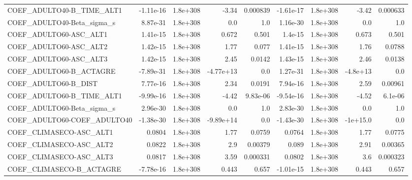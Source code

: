 \begin{tabular}{lrrrrrrrr}
COEF\_ADULTO40-B\_TIME\_ALT1         &   -1.11e-16 &     1.8e+308 &     -3.34 & 0.000839 &  -1.61e-17 &    1.8e+308 &        -3.42 &      0.000633 \\
COEF\_ADULTO40-Beta\_sigma\_s        &    8.87e-31 &     1.8e+308 &       0.0 &      1.0 &   1.16e-30 &    1.8e+308 &          0.0 &           1.0 \\
COEF\_ADULTO60-ASC\_ALT1            &    1.41e-15 &     1.8e+308 &     0.672 &    0.501 &    1.4e-15 &    1.8e+308 &        0.673 &         0.501 \\
COEF\_ADULTO60-ASC\_ALT2            &    1.42e-15 &     1.8e+308 &      1.77 &    0.077 &   1.41e-15 &    1.8e+308 &         1.76 &        0.0788 \\
COEF\_ADULTO60-ASC\_ALT3            &    1.42e-15 &     1.8e+308 &      2.45 &   0.0142 &   1.43e-15 &    1.8e+308 &         2.46 &        0.0138 \\
COEF\_ADULTO60-B\_ACTAGRE           &   -7.89e-31 &     1.8e+308 & -4.77e+13 &      0.0 &   1.27e-31 &    1.8e+308 &     -4.8e+13 &           0.0 \\
COEF\_ADULTO60-B\_DIST              &    7.77e-16 &     1.8e+308 &      2.34 &   0.0191 &   7.94e-16 &    1.8e+308 &         2.59 &       0.00961 \\
COEF\_ADULTO60-B\_TIME\_ALT1         &   -9.99e-16 &     1.8e+308 &     -4.42 & 9.83e-06 &  -9.54e-16 &    1.8e+308 &        -4.52 &       6.1e-06 \\
COEF\_ADULTO60-Beta\_sigma\_s        &    2.96e-30 &     1.8e+308 &       0.0 &      1.0 &   2.83e-30 &    1.8e+308 &          0.0 &           1.0 \\
COEF\_ADULTO60-COEF\_ADULTO40       &   -1.38e-30 &     1.8e+308 & -9.89e+14 &      0.0 &  -1.43e-30 &    1.8e+308 &     -1e+15.0 &           0.0 \\
COEF\_CLIMASECO-ASC\_ALT1           &      0.0804 &     1.8e+308 &      1.77 &   0.0759 &     0.0764 &    1.8e+308 &         1.77 &        0.0775 \\
COEF\_CLIMASECO-ASC\_ALT2           &      0.0822 &     1.8e+308 &       2.9 &  0.00379 &      0.089 &    1.8e+308 &         2.91 &       0.00365 \\
COEF\_CLIMASECO-ASC\_ALT3           &      0.0817 &     1.8e+308 &      3.59 & 0.000331 &     0.0802 &    1.8e+308 &          3.6 &      0.000323 \\
COEF\_CLIMASECO-B\_ACTAGRE          &   -7.78e-16 &     1.8e+308 &     0.443 &    0.657 &  -1.01e-15 &    1.8e+308 &        0.443 &         0.657 \\

\end{tabular}
